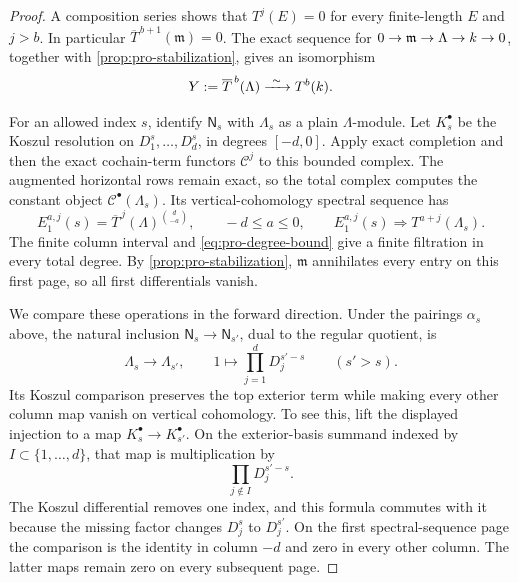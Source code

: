
\begin{proof}
A composition series shows that $T^j(E)=0$ for every finite-length
$E$ and $j>b$.  In particular
$\overline T^{\,b+1}(\mathfrak m)=0$.  The exact sequence for
$0\to\mathfrak m\to\Lambda\to k\to0$, together with
\cref{prop:pro-stabilization}, gives an isomorphism
\begin{equation}
\label{eq:pro-top-identification}
 Y:=\overline T^{\,b}(\Lambda)\xrightarrow{\ \sim\ }T^b(\kk).
\end{equation}

For an allowed index $s$, identify $\mathsf N_s$ with
$\Lambda_s$ as a plain $\Lambda$-module.  Let $K_s^\bullet$
be the Koszul resolution on $D_1^s,\ldots,D_d^s$, in degrees
$[-d,0]$.  Apply exact completion and then the exact cochain-term
functors $\mathcal C^j$ to this bounded complex.  The augmented
horizontal rows remain exact, so the total complex computes the
constant object $\mathcal C^\bullet(\Lambda_s)$.
Its vertical-cohomology spectral sequence has
\[
 E_1^{a,j}(s)=
 \overline T^{\,j}(\Lambda)^{\binom d{-a}},
 \qquad -d\leq a\leq0,
 \qquad
 E_1^{a,j}(s)\Longrightarrow T^{a+j}(\Lambda_s).
\]
The finite column interval and \cref{eq:pro-degree-bound} give a
finite filtration in every total degree.  By
\cref{prop:pro-stabilization}, $\mathfrak m$ annihilates every
entry on this first page, so all first differentials vanish.

We compare these operations in the forward direction. Under the
pairings $\alpha_s$ above, the natural inclusion
$\mathsf N_s\to\mathsf N_{s'}$, dual to the regular quotient, is
\[
 \Lambda_s\longrightarrow\Lambda_{s'},\qquad
 1\longmapsto\prod_{j=1}^dD_j^{s'-s}
 \qquad(s'>s).
\]
Its Koszul comparison preserves the top exterior term while making
every other column map vanish on vertical cohomology. To see this,
lift the displayed injection to a map
$K_s^\bullet\to K_{s'}^\bullet$.
On the exterior-basis summand indexed by
$I\subset\{1,\ldots,d\}$, that map is multiplication by
\[
 \prod_{j\notin I}D_j^{s'-s}.
\]
The Koszul differential removes one index, and this formula
commutes with it because the missing factor changes $D_j^s$
to $D_j^{s'}$.  On the first spectral-sequence page the comparison
is the identity in column $-d$ and zero in every other column.
The latter maps remain zero on every subsequent page.


\end{proof}
